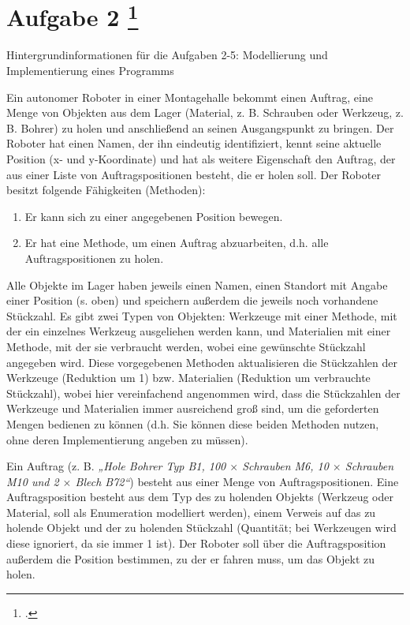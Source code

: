 \documentclass{lehramt-informatik-aufgabe}
\begin{document}
\section{Aufgabe 2
\footcite{examen:66116:2019:03}}

Hintergrundinformationen für die Aufgaben 2-5: Modellierung und
Implementierung eines Programms
\begin{mdframed}[backgroundcolor=white]
\footnotesize
Ein autonomer Roboter in einer Montagehalle bekommt einen Auftrag, eine
Menge von Objekten aus dem Lager (Material, z. B. Schrauben oder
Werkzeug, z. B. Bohrer) zu holen und anschließend an seinen
Ausgangspunkt zu bringen. Der Roboter hat einen Namen, der ihn eindeutig
identifiziert, kennt seine aktuelle Position (x- und y-Koordinate) und
hat als weitere Eigenschaft den Auftrag, der aus einer Liste von
Auftragspositionen besteht, die er holen soll. Der Roboter besitzt
folgende Fähigkeiten (Methoden):

\begin{enumerate}
\item Er kann sich zu einer angegebenen Position bewegen.

\item Er hat eine Methode, um einen Auftrag abzuarbeiten, d.h. alle
Auftragspositionen zu holen.
\end{enumerate}

Alle Objekte im Lager haben jeweils einen Namen, einen Standort mit
Angabe einer Position (s. oben) und speichern außerdem die jeweils noch
vorhandene Stückzahl. Es gibt zwei Typen von Objekten: Werkzeuge mit
einer Methode, mit der ein einzelnes Werkzeug ausgeliehen werden kann,
und Materialien mit einer Methode, mit der sie verbraucht werden, wobei
eine gewünschte Stückzahl angegeben wird. Diese vorgegebenen Methoden
aktualisieren die Stückzahlen der Werkzeuge (Reduktion um 1) bzw.
Materialien (Reduktion um verbrauchte Stückzahl), wobei hier
vereinfachend angenommen wird, dass die Stückzahlen der Werkzeuge und
Materialien immer ausreichend groß sind, um die geforderten Mengen
bedienen zu können (d.h. Sie können diese beiden Methoden nutzen, ohne
deren Implementierung angeben zu müssen).

Ein Auftrag (z. B. \emph{„Hole Bohrer Typ B1, 100 $\times$ Schrauben M6,
10 $\times$ Schrauben M10 und 2 $\times$ Blech B72“}) besteht aus einer
Menge von Auftragspositionen. Eine Auftragsposition besteht aus dem Typ
des zu holenden Objekts (Werkzeug oder Material, soll als Enumeration
modelliert werden), einem Verweis auf das zu holende Objekt und der zu
holenden Stückzahl (Quantität; bei Werkzeugen wird diese ignoriert, da
sie immer 1 ist). Der Roboter soll über die Auftragsposition außerdem
die Position bestimmen, zu der er fahren muss, um das Objekt zu holen.


\end{mdframed}
\end{document}
